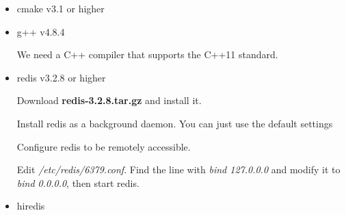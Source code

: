 \documentclass[letterpaper,12pt]{article}
\begin{document}
\begin{itemize}

\item cmake v3.1 or higher

\begin{center}
\noindent{}
\end{center}

\item g++ v4.8.4

We need a C++ compiler that supports the C++11 standard.

\begin{center}
\noindent{}
\end{center}

\item redis v3.2.8 or higher

Download {\bf redis-3.2.8.tar.gz} and install it.

\begin{center}
\noindent{}
\end{center}

Install redis as a background daemon. You can just use the default settings

\begin{center}
\noindent{}
\end{center}

Configure redis to be remotely accessible.
%

\begin{center}
\noindent{}
\end{center}

Edit {\sl /etc/redis/6379.conf}. Find the line with {\em bind 127.0.0.0}
and modify it to {\em bind 0.0.0.0}, then start redis.

%
\begin{center}
\noindent{}
\end{center}

\item hiredis


\end{itemize}
\end{document}
